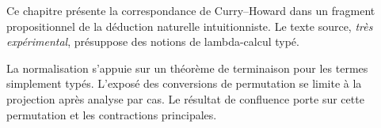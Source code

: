 \documentclass[../../../include/open-logic-chapter]{subfiles}
\begin{document}

Ce chapitre présente la correspondance de Curry--Howard
dans un fragment propositionnel de la déduction naturelle
intuitionniste. Le texte source, \emph{très expérimental},
présuppose des notions de lambda-calcul typé.

La normalisation s'appuie sur un théorème de terminaison
pour les termes simplement typés. L'exposé des conversions
de permutation se limite à la projection après analyse
par cas. Le résultat de confluence porte sur cette
%
%
%
%
%
%
%
%
%
%
%
%
%
%
permutation et les contractions principales.


\OLEndChapterHook
\end{document}
